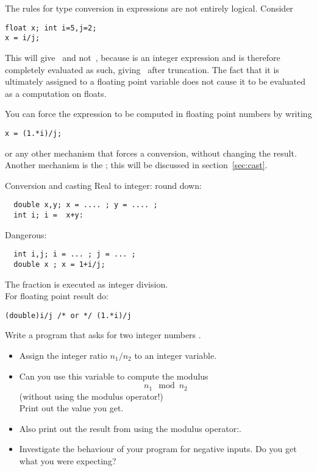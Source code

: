 The rules for type conversion in expressions are not entirely
logical. Consider
\begin{verbatim}
float x; int i=5,j=2;
x = i/j;
\end{verbatim}
This will give~ and not~, because  is an integer
expression and is therefore completely evaluated as such, giving~
after truncation. The fact
that it is ultimately assigned to a floating point variable does not
cause it to be evaluated as a computation on floats.

You can force the expression to be computed in floating point numbers
by writing
\begin{verbatim}
x = (1.*i)/j;
\end{verbatim}
or any other mechanism that forces a conversion, without changing the
result.  Another mechanism is the ; this will be
discussed in section~\ref{sec:cast}.

\begin{slide}{Conversion and casting}
  \label{sl:convert-cast}
  Real to integer: round down:
\begin{verbatim}
  double x,y; x = .... ; y = .... ;
  int i; i =  x+y:
\end{verbatim}
Dangerous:
\begin{verbatim}
  int i,j; i = ... ; j = ... ; 
  double x ; x = 1+i/j;
\end{verbatim}
The fraction is executed as integer division.\\
For floating point result do:
\begin{verbatim}
(double)i/j /* or */ (1.*i)/j
\end{verbatim}
\end{slide}

\begin{exercise}
  \label{ex:modulus}
  Write a program that asks for two integer numbers .
  \begin{itemize}
  \item Assign the integer ratio $n_1/n_2$ to an integer variable.
  \item Can you use this variable to compute the modulus
    \[ n_1\mod n_2 \]
    (without using the  modulus operator!)\\
    Print out the value you get.
  \item Also print out the result from using the modulus
    operator:.
  \item Investigate the behaviour of your program for negative
    inputs. Do you get what you were expecting?
  \end{itemize}
\end{exercise}

